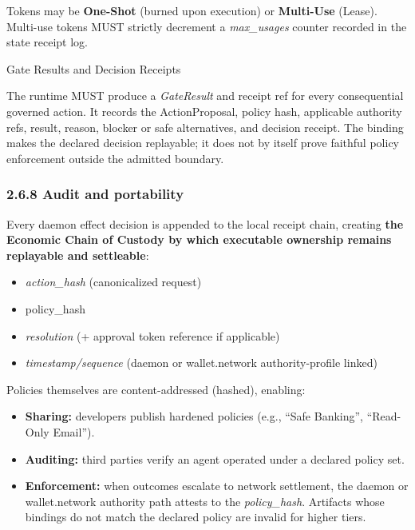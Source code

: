 \documentclass[
  11pt,
]{article}
\providecommand{\tightlist}{%
  \setlength{\itemsep}{0pt}\setlength{\parskip}{0pt}}
\begin{document}
Tokens may be \textbf{One-Shot} (burned upon execution) or
\textbf{Multi-Use} (Lease). Multi-use tokens MUST strictly decrement a
\emph{max\_usages} counter recorded in the state receipt log.

Gate Results and Decision Receipts

The runtime MUST produce a \emph{GateResult} and receipt ref for every
consequential governed action. It records the ActionProposal, policy hash,
applicable authority refs, result, reason, blocker or safe alternatives, and
decision receipt. The binding makes the declared decision replayable; it does
not by itself prove faithful policy enforcement outside the admitted boundary.

\hypertarget{audit-and-portability}{%
\subsubsection{2.6.8 Audit and
portability}\label{audit-and-portability}}

Every daemon effect decision is appended to the local receipt chain, creating
\textbf{the Economic Chain of Custody by which executable ownership
remains replayable and settleable}:

\begin{itemize}
\tightlist
\item
  \emph{action\_hash} (canonicalized request)
\item
  policy\_hash
\item
  \emph{resolution} (+ approval token reference if applicable)
\item
  \emph{timestamp/sequence} (daemon or wallet.network authority-profile linked)
\end{itemize}

Policies themselves are content-addressed (hashed), enabling:

\begin{itemize}
\tightlist
\item
  \textbf{Sharing:} developers publish hardened policies (e.g., ``Safe
  Banking'', ``Read-Only Email'').
\item
  \textbf{Auditing:} third parties verify an agent operated under a
  declared policy set.
\item
  \textbf{Enforcement:} when outcomes escalate to network settlement,
  the daemon or wallet.network authority path attests
  to the \emph{policy\_hash}. Artifacts whose bindings do not match the
  declared policy are invalid for higher tiers.
\end{itemize}
\end{document}
